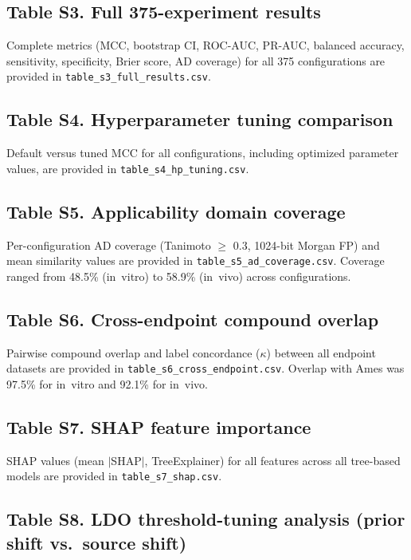 \subsection*{Table S3. Full 375-experiment results}

Complete metrics (MCC, bootstrap CI, ROC-AUC, PR-AUC, balanced accuracy, sensitivity, specificity, Brier score, AD coverage) for all 375 configurations are provided in \texttt{table\_s3\_full\_results.csv}.

\subsection*{Table S4. Hyperparameter tuning comparison}

Default versus tuned MCC for all configurations, including optimized parameter values, are provided in \texttt{table\_s4\_hp\_tuning.csv}.

\subsection*{Table S5. Applicability domain coverage}

Per-configuration AD coverage (Tanimoto $\geq$ 0.3, 1024-bit Morgan FP) and mean similarity values are provided in \texttt{table\_s5\_ad\_coverage.csv}. Coverage ranged from 48.5\% (in~vitro) to 58.9\% (in~vivo) across configurations.

\subsection*{Table S6. Cross-endpoint compound overlap}

Pairwise compound overlap and label concordance ($\kappa$) between all endpoint datasets are provided in \texttt{table\_s6\_cross\_endpoint.csv}. Overlap with Ames was 97.5\% for in~vitro and 92.1\% for in~vivo.

\subsection*{Table S7. SHAP feature importance}

SHAP values (mean $|$SHAP$|$, TreeExplainer) for all features across all tree-based models are provided in \texttt{table\_s7\_shap.csv}.

\subsection*{Table S8. LDO threshold-tuning analysis (prior shift vs.\ source shift)}

